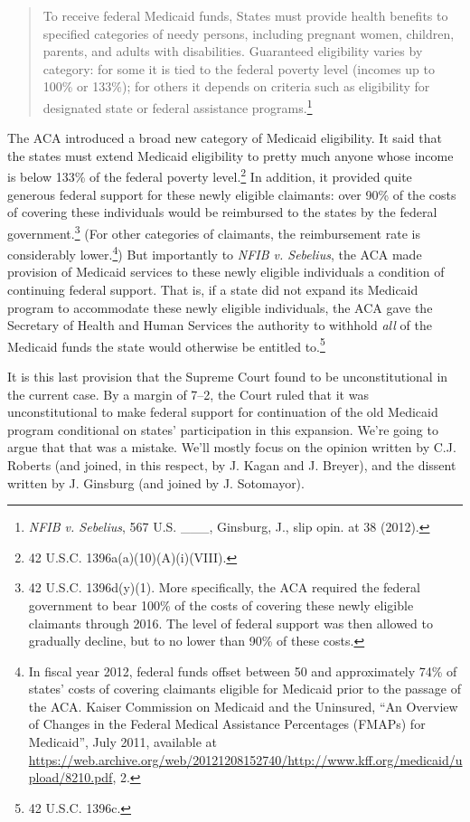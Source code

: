 \documentclass[
  11pt,
  letterpaper,
  DIV=11,
  numbers=noendperiod,
  twoside]{scrartcl}
\begin{document}
\begin{quote}
To receive federal Medicaid funds, States must provide health benefits
to specified categories of needy persons, including pregnant women,
children, parents, and adults with disabilities. Guaranteed eligibility
varies by category: for some it is tied to the federal poverty level
(incomes up to 100\% or 133\%); for others it depends on criteria such
as eligibility for designated state or federal assistance
programs.\footnote{\emph{NFIB v. Sebelius}, 567 U.S. \_\_\_, Ginsburg,
  J., slip opin. at 38 (2012).}
\end{quote}

The ACA introduced a broad new category of Medicaid eligibility. It said
that the states must extend Medicaid eligibility to pretty much anyone
whose income is below 133\% of the federal poverty level.\footnote{42
  U.S.C. 1396a(a)(10)(A)(i)(VIII).} In addition, it provided quite
generous federal support for these newly eligible claimants: over 90\%
of the costs of covering these individuals would be reimbursed to the
states by the federal government.\footnote{42 U.S.C. 1396d(y)(1). More
  specifically, the ACA required the federal government to bear 100\% of
  the costs of covering these newly eligible claimants through 2016. The
  level of federal support was then allowed to gradually decline, but to
  no lower than 90\% of these costs.} (For other categories of
claimants, the reimbursement rate is considerably lower.\footnote{In
  fiscal year 2012, federal funds offset between 50 and approximately
  74\% of states' costs of covering claimants eligible for Medicaid
  prior to the passage of the ACA. Kaiser Commission on Medicaid and the
  Uninsured, ``An Overview of Changes in the Federal Medical Assistance
  Percentages (FMAPs) for Medicaid'', July 2011, available at
  \url{https://web.archive.org/web/20121208152740/http://www.kff.org/medicaid/upload/8210.pdf},
  2.}) But importantly to \emph{NFIB v. Sebelius}, the ACA made
provision of Medicaid services to these newly eligible individuals a
condition of continuing federal support. That is, if a state did not
expand its Medicaid program to accommodate these newly eligible
individuals, the ACA gave the Secretary of Health and Human Services the
authority to withhold \emph{all} of the Medicaid funds the state would
otherwise be entitled to.\footnote{42 U.S.C. 1396c.}

It is this last provision that the Supreme Court found to be
unconstitutional in the current case. By a margin of 7--2, the Court
ruled that it was unconstitutional to make federal support for
continuation of the old Medicaid program conditional on states'
participation in this expansion. We're going to argue that that was a
mistake. We'll mostly focus on the opinion written by C.J. Roberts (and
joined, in this respect, by J. Kagan and J. Breyer), and the dissent
written by J. Ginsburg (and joined by J. Sotomayor).
\end{document}
